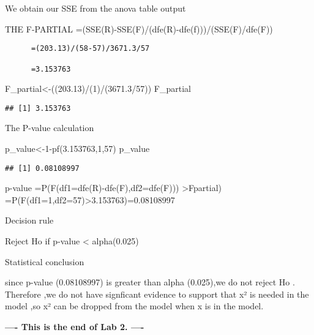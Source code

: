 \documentclass[
]{article}
\newenvironment{Shaded}{\begin{snugshade}}{\end{snugshade}}
\newcommand{\DecValTok}[1]{\textcolor[rgb]{0.00,0.00,0.81}{#1}}
\newcommand{\FloatTok}[1]{\textcolor[rgb]{0.00,0.00,0.81}{#1}}
\newcommand{\FunctionTok}[1]{\textcolor[rgb]{0.00,0.00,0.00}{#1}}
\newcommand{\NormalTok}[1]{#1}
\newcommand{\OtherTok}[1]{\textcolor[rgb]{0.56,0.35,0.01}{#1}}
\newcommand{\SpecialCharTok}[1]{\textcolor[rgb]{0.00,0.00,0.00}{#1}}
\begin{document}
We obtain our SSE from the anova table output

THE F-PARTIAL =(SSE(R)-SSE(F)/(dfe(R)-dfe(f)))/(SSE(F)/dfe(F))

\begin{verbatim}
      =(203.13)/(58-57)/3671.3/57
      
      =3.153763
\end{verbatim}

\begin{Shaded}
\begin{Highlighting}[]
\NormalTok{F\_partial}\OtherTok{\textless{}{-}}\NormalTok{((}\FloatTok{203.13}\NormalTok{)}\SpecialCharTok{/}\NormalTok{(}\DecValTok{1}\NormalTok{)}\SpecialCharTok{/}\NormalTok{(}\FloatTok{3671.3}\SpecialCharTok{/}\DecValTok{57}\NormalTok{))}
\NormalTok{F\_partial}
\end{Highlighting}
\end{Shaded}

\begin{verbatim}
## [1] 3.153763
\end{verbatim}

The P-value calculation

\begin{Shaded}
\begin{Highlighting}[]
\NormalTok{p\_value}\OtherTok{\textless{}{-}}\DecValTok{1}\SpecialCharTok{{-}}\FunctionTok{pf}\NormalTok{(}\FloatTok{3.153763}\NormalTok{,}\DecValTok{1}\NormalTok{,}\DecValTok{57}\NormalTok{)}
\NormalTok{p\_value}
\end{Highlighting}
\end{Shaded}

\begin{verbatim}
## [1] 0.08108997
\end{verbatim}

p-value =P(F(df1=dfe(R)-dfe(F),df2=dfe(F))) \textgreater Fpartial)
=P(F(df1=1,df2=57)\textgreater3.153763)=0.08108997

Decision rule

Reject Ho if p-value \textless{} alpha(0.025)

Statistical conclusion

since p-value (0.08108997) is greater than alpha (0.025),we do not
reject Ho . Therefore ,we do not have signficant evidence to support
that x² is needed in the model ,so x² can be dropped from the model when
x is in the model.

\bigskip
\begin{center}
\textbf{---- This is the end of Lab 2. ----}
\end{center}
\end{document}
